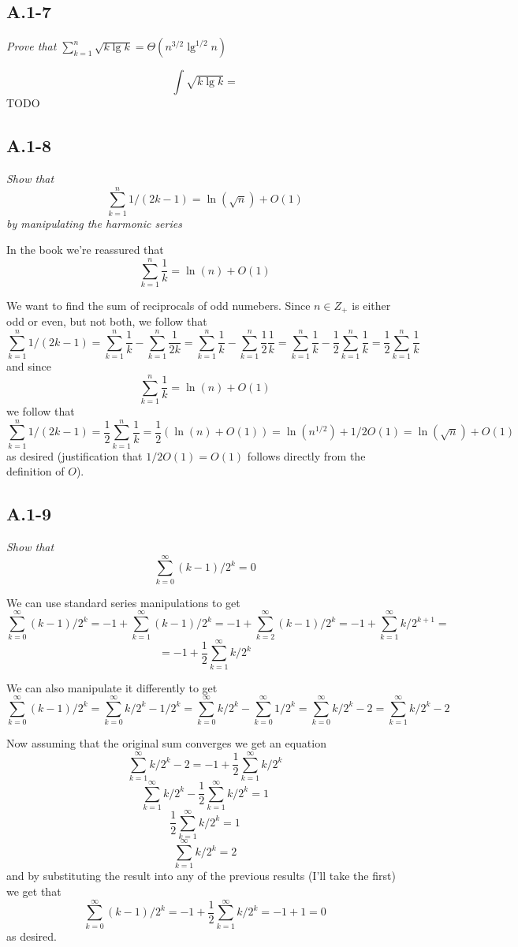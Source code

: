 \documentclass[11pt,oneside,titlepage]{book}
\begin{document}
\subsection*{A.1-7}
\textit{Prove that $\sum_{k = 1}^n{\sqrt{k \lg k}} = \Theta(n^{3/2}\lg^{1/2}n)$}

$$\int \sqrt{k \lg k} = $$
TODO

\subsection*{A.1-8}
\textit{Show that
  $$\sum_{k = 1}^{n}{1/(2k - 1)} = \ln(\sqrt{n}) + O(1)$$
  by manipulating the harmonic series
}

In the book we're reassured that
$$\sum_{k = 1}^n{\frac{1}{k}} = \ln(n) + O(1)$$

We want to find the sum of reciprocals of odd numebers. Since $n \in Z_+$ is
either odd or even, but not both, we follow that
$$\sum_{k = 1}^{n}{1/(2k - 1)} = \sum_{k = 1}^n{\frac{1}{k}} -
\sum_{k = 1}^{n}{\frac{1}{2k}} =
\sum_{k = 1}^n{\frac{1}{k}} - \sum_{k = 1}^{n}{\frac{1}{2} \frac{1}{k}} =
\sum_{k = 1}^n{\frac{1}{k}} - \frac{1}{2}\sum_{k = 1}^{n}{\frac{1}{k}} =
\frac{1}{2}\sum_{k = 1}^{n}{\frac{1}{k}} $$
and since
$$\sum_{k = 1}^n{\frac{1}{k}} = \ln(n) + O(1)$$
we follow that
$$\sum_{k = 1}^{n}{1/(2k - 1)} = \frac{1}{2}\sum_{k = 1}^{n}{\frac{1}{k}}  =
\frac{1}{2}(\ln(n) + O(1)) = \ln(n^{1/2}) + 1/2 O(1) =
\ln(\sqrt{n}) + O(1) $$
as desired (justification that $1/2 O(1) = O(1)$ follows directly from the
definition of $O$).

\subsection*{A.1-9}
\textit{Show that}
$$\sum_{k = 0}^{\infty}{(k - 1)/2^k} = 0$$

We can use standard series manipulations to get
$$\sum_{k = 0}^\infty{(k - 1) / 2^k} = -1 + \sum_{k = 1}^\infty{(k - 1) / 2^k} =
-1 + \sum_{k = 2}^\infty{(k - 1) / 2^k} = -1 + \sum_{k = 1}^\infty{k / 2^{k + 1}} = $$
$$ = -1 + \frac{1}{2} \sum_{k = 1}^\infty{k / 2^{k}}$$

We can also manipulate it differently to get
$$\sum_{k = 0}^\infty{(k - 1) / 2^k} = \sum_{k = 0}^\infty{k/ 2^k - 1/2^k} =
\sum_{k = 0}^\infty{k/ 2^k} -  \sum_{k = 0}^\infty{1/2^k} =
\sum_{k = 0}^\infty{k/ 2^k} - 2 =  \sum_{k = 1}^\infty{k/ 2^k} - 2$$

Now assuming that the original sum converges we get an equation
$$\sum_{k = 1}^\infty{k/ 2^k} - 2 = -1 + \frac{1}{2} \sum_{k = 1}^\infty{k / 2^{k}}$$
$$\sum_{k = 1}^\infty{k/ 2^k} - \frac{1}{2} \sum_{k = 1}^\infty{k / 2^{k}}  = 1 $$
$$\frac{1}{2} \sum_{k = 1}^\infty{k/ 2^k}  = 1 $$
$$\sum_{k = 1}^\infty{k/ 2^k}  = 2$$
and by substituting the result into any of the previous results (I'll take the first) we get that
$$\sum_{k = 0}^\infty{(k - 1) / 2^k} = -1 + \frac{1}{2} \sum_{k = 1}^\infty{k / 2^{k}} =
-1 + 1 = 0$$
as desired.
\end{document}
